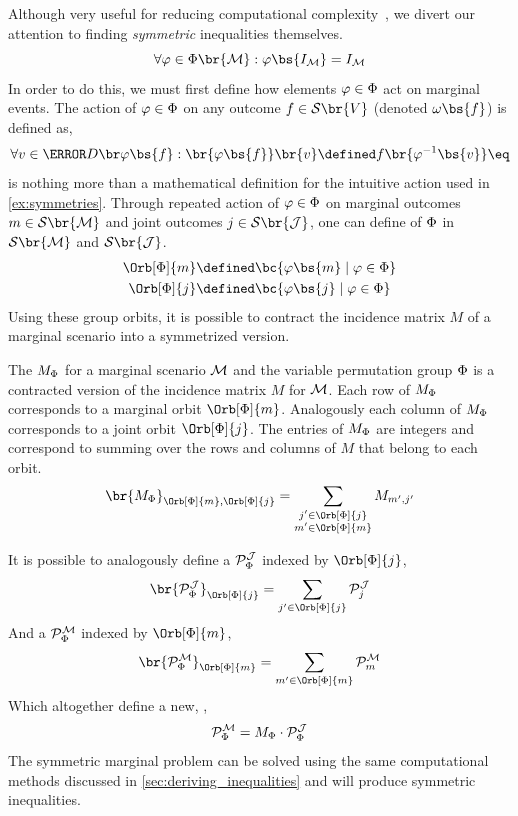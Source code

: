 \documentclass[aps, 10pt, english, twoside, pra, nofootinbib, tightenlines, longbibliography]{revtex4-1}
\renewcommand{\Events}[1]{\mathcal{S}\br{#1}} %
\begin{document}
    Although very useful for reducing computational complexity~\cite{Bancal_2010}, we divert our attention to finding \textit{symmetric} inequalities themselves.
    \[ \forall \varphi \in \gp\br{\mscenario} :  \varphi\bs{I_{\mscenario}} = I_{\mscenario} \]
    In order to do this, we must first define how elements $\varphi \in \Phi$ act on marginal events. The action of $\varphi \in \Phi$ on any outcome $f \in \Events{V}$ (denoted $\geo\bs{f}$) is defined as,
    \[ \forall v \in \Dom{\varphi\bs{f}} : \br{\varphi\bs{f}}\br{v} \defined f\br{\varphi^{-1}\bs{v}} \eq \label{eq:act_on_variable}\]
     is nothing more than a mathematical definition for the intuitive action used in \cref{ex:symmetries}.
    Through repeated action of $\varphi \in \Phi$ on marginal outcomes $m \in \Events{\mscenario}$ and joint outcomes $j \in \Events{\jointvar}$, one can define  of $\Phi$ in $\Events{\mscenario}$ and $\Events{\jointvar}$.
    \begin{align*}
        \Orb[\gp]{m} &\defined \bc{\varphi\bs{m} \mid \varphi \in \gp} \\
        \Orb[\gp]{j} &\defined \bc{\varphi\bs{j} \mid \varphi \in \gp}
    \end{align*}
    Using these group orbits, it is possible to contract the incidence matrix $M$ of a marginal scenario into a symmetrized version.

    \begin{definition}
        The  $M_{\Phi}$ for a marginal scenario $\mathcal{M}$ and the variable permutation group $\Phi$ is a contracted version of the incidence matrix $M$ for $\mathcal{M}$. Each row of $M_{\Phi}$ corresponds to a marginal orbit $\Orb[\gp]{m}$. Analogously each column of $M_{\Phi}$ corresponds to a joint orbit $\Orb[\gp]{j}$. The entries of $M_{\Phi}$ are integers and correspond to summing over the rows and columns of $M$ that belong to each orbit.
        \[ \br{M_{\gp}}_{\Orb[\gp]{m}, \Orb[\gp]{j}} = \sum_{\substack{j' \in \Orb[\gp]{j} \\ m' \in \Orb[\gp]{m}}} M_{m',j'} \]
    \end{definition}
    It is possible to analogously define a  $\probvec^{\jointvar}_{\Phi}$ indexed by $\Orb[\gp]{j}$,
    \[ \br{\probvec^{\jointvar}_{\Phi}}_{\Orb[\gp]{j}} = \sum_{j' \in \Orb[\gp]{j}} \probvec^{\jointvar}_{j} \]
    And a  $\probvec^{\mscenario}_{\Phi}$ indexed by $\Orb[\gp]{m}$,
    \[ \br{\probvec^{\mscenario}_{\Phi}}_{\Orb[\gp]{m}} = \sum_{m' \in \Orb[\gp]{m}} \probvec^{\mscenario}_{m} \]
    Which altogether define a new, ,
    \[ \probvec^{\mscenario}_{\Phi} = M_{\gp} \cdot \probvec^{\jointvar}_{\Phi} \]
    The symmetric marginal problem can be solved using the same computational methods discussed in \cref{sec:deriving_inequalities} and will produce symmetric inequalities.
\end{document}
